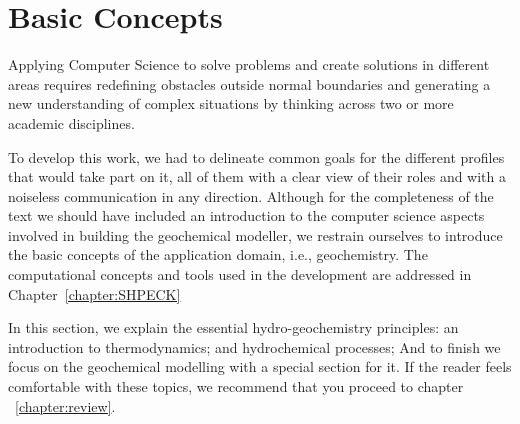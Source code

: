 \documentclass[ppgc,mestrado,English]{iiufrgs}
\begin{document}
\chapter{Basic Concepts}
\label{chapter:basic}

Applying Computer Science to solve problems and create solutions in different areas requires redefining obstacles outside normal boundaries and generating a new understanding of complex situations by thinking across two or more academic disciplines. 

To develop this work, we had to delineate common goals for the different profiles that would take part on it, all of them with a clear view of their roles and with a noiseless communication in any direction. Although for the completeness of the text we should have included an introduction to the computer science aspects involved in building the geochemical modeller, we restrain ourselves to introduce the basic concepts of the application domain, i.e., geochemistry. The computational concepts and tools used in the development are addressed in Chapter~\ref{chapter:SHPECK}

In this section, we explain the essential hydro-geochemistry principles: an introduction to thermodynamics; and hydrochemical processes; And to finish we focus on the geochemical modelling with a special section for it. If the reader feels comfortable with these topics, we recommend that you proceed to chapter ~\ref{chapter:review}.


\end{document}
